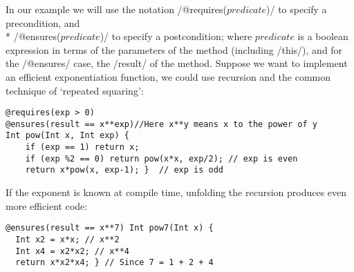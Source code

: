 In our example we will use the notation /@requires($predicate$)/ 
to specify a precondition, and\\* /@ensures($predicate$)/ 
to specify a postcondition; where $predicate$ is a boolean expression
in terms of the parameters of the method (including /this/), and for the /@ensures/ case, the /result/ of the method.
Suppose we want to implement an efficient exponentiation function, we could use recursion and the common technique of `repeated squaring':
\vspace{-1ex}
\begin{lstlisting}
@requires(exp > 0)
@ensures(result == x**exp)//Here x**y means x to the power of y
Int pow(Int x, Int exp) {
	if (exp == 1) return x;
	if (exp %2 == 0) return pow(x*x, exp/2); // exp is even
	return x*pow(x, exp-1); }  // exp is odd
\end{lstlisting}
If the exponent is known at compile time,
unfolding the recursion produces even more efficient code:
\vspace{-1ex}
\begin{lstlisting}
@ensures(result == x**7) Int pow7(Int x) { 
  Int x2 = x*x; // x**2
  Int x4 = x2*x2; // x**4
  return x*x2*x4; } // Since 7 = 1 + 2 + 4
\end{lstlisting}
\vspace{-1ex}

 
